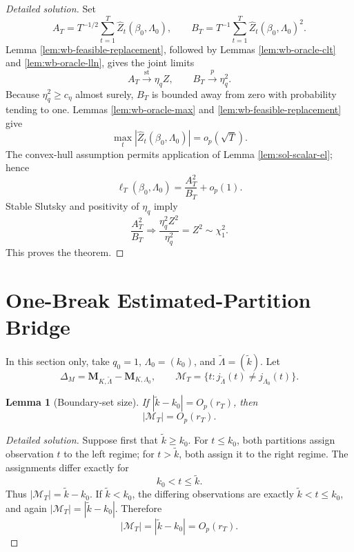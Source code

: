 \documentclass[12pt]{article}
\numberwithin{equation}{section}
\newtheorem{lemma}{Lemma}
\theoremstyle{definition}
\begin{document}
\begin{proof}[Detailed solution]
Set
\[
    A_T=T^{-1/2}\sum_{t=1}^T
       \widehat Z_t(\beta_0,\Lambda_0),
    \qquad
    B_T=T^{-1}\sum_{t=1}^T
       \widehat Z_t(\beta_0,\Lambda_0)^2.
\]
Lemma \ref{lem:wb-feasible-replacement}, followed by Lemmas
\ref{lem:wb-oracle-clt} and \ref{lem:wb-oracle-lln}, gives the joint limits
\[
    A_T\xrightarrow{\mathrm{st}}\eta_qZ,
    \qquad
    B_T\xrightarrow{p}\eta_q^2.
\]
Because \(\eta_q^2\geq c_\eta\) almost surely, \(B_T\) is bounded away from
zero with probability tending to one.  Lemmas \ref{lem:wb-oracle-max} and
\ref{lem:wb-feasible-replacement} give
\[
    \max_t|\widehat Z_t(\beta_0,\Lambda_0)|=o_p(\sqrt T).
\]
The convex-hull assumption permits application of Lemma
\ref{lem:sol-scalar-el}; hence
\[
    \ell_T(\beta_0,\Lambda_0)
    =\frac{A_T^2}{B_T}+o_p(1).
\]
Stable Slutsky and positivity of \(\eta_q\) imply
\[
    \frac{A_T^2}{B_T}
    \Rightarrow
    \frac{\eta_q^2Z^2}{\eta_q^2}=Z^2\sim\chi_1^2.
\]
This proves the theorem.
\end{proof}


\section{One-Break Estimated-Partition Bridge}
\label{sec:one-break-bridge}

In this section only, take \(q_0=1\), \(\Lambda_0=(k_0)\), and \(\widetilde\Lambda=(\widetilde k)\). Let
\[
    \Delta_M=\bm M_{K,\widetilde\Lambda}-\bm M_{K,\Lambda_0},
    \qquad
    \mathcal M_T=\{t:j_{\widetilde\Lambda}(t)\neq j_{\Lambda_0}(t)\}.
\]

\begin{lemma}[Boundary-set size]
\label{lem:wb-boundary-size}
If \(|\widetilde k-k_0|=O_p(r_T)\), then
\[
    |\mathcal M_T|=O_p(r_T).
\]
\end{lemma}


\begin{proof}[Detailed solution]
Suppose first that \(\widetilde k\geq k_0\).  For
\(t\leq k_0\), both partitions assign observation \(t\) to the left regime;
for \(t>\widetilde k\), both assign it to the right regime.  The assignments
differ exactly for
\[
    k_0<t\leq\widetilde k.
\]
Thus \(|\mathcal M_T|=\widetilde k-k_0\).  If
\(\widetilde k<k_0\), the differing observations are exactly
\(\widetilde k<t\leq k_0\), and again
\(|\mathcal M_T|=|\widetilde k-k_0|\).  Therefore
\[
    |\mathcal M_T|=|\widetilde k-k_0|=O_p(r_T).
\]
\end{proof}
\end{document}
